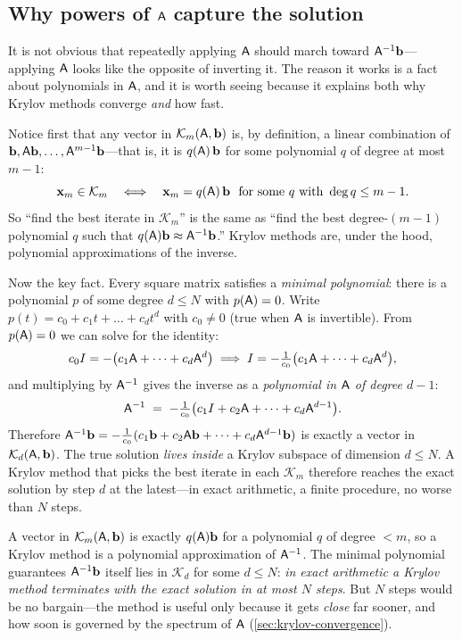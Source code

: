 \subsection{Why powers of \texorpdfstring{$\mathsf{A}$}{A} capture the solution}
\label{sec:krylov-poly}

It is not obvious that repeatedly applying $\mathsf{A}$ should march toward
$\mathsf{A}^{-1}\mathbf{b}$---applying $\mathsf{A}$ looks like the opposite of inverting it. The
reason it works is a fact about polynomials in $\mathsf{A}$, and it is worth seeing
because it explains both why Krylov methods converge \emph{and} how fast.

Notice first that any vector in $\mathcal{K}_m(\mathsf{A},\mathbf{b})$ is, by definition, a
linear combination of $\mathbf{b},\mathsf{A}\mathbf{b},\dots,\mathsf{A}^{m-1}\mathbf{b}$---that is, it is
$q(\mathsf{A})\,\mathbf{b}$ for some polynomial $q$ of degree at most $m-1$:
\[
  \mathbf{x}_m \in \mathcal{K}_m
  \quad\Longleftrightarrow\quad
  \mathbf{x}_m = q(\mathsf{A})\,\mathbf{b}
  \ \text{ for some } q \text{ with } \deg q \le m-1 .
\]
So ``find the best iterate in $\mathcal{K}_m$'' is the same as ``find the best
degree-$(m-1)$ polynomial $q$ such that $q(\mathsf{A})\mathbf{b}\approx\mathsf{A}^{-1}\mathbf{b}$.''
Krylov methods are, under the hood, polynomial approximations of the inverse.

Now the key fact. Every square matrix satisfies a \emph{minimal polynomial}: there
is a polynomial $p$ of some degree $d\le N$ with $p(\mathsf{A})=0$. Write
$p(t)=c_0+c_1t+\dots+c_d t^d$ with $c_0\neq0$ (true when $\mathsf{A}$ is invertible).
From $p(\mathsf{A})=0$ we can solve for the identity:
\[
  c_0 I = -\bigl(c_1\mathsf{A}+\dots+c_d\mathsf{A}^d\bigr)
  \;\Longrightarrow\;
  I = -\tfrac{1}{c_0}\bigl(c_1\mathsf{A}+\dots+c_d\mathsf{A}^d\bigr),
\]
and multiplying by $\mathsf{A}^{-1}$ gives the inverse as a \emph{polynomial in
$\mathsf{A}$ of degree $d-1$}:
\[
  \mathsf{A}^{-1} \;=\; -\tfrac{1}{c_0}\bigl(c_1 I + c_2\mathsf{A} + \dots + c_d\mathsf{A}^{d-1}\bigr).
\]
Therefore $\mathsf{A}^{-1}\mathbf{b}=-\tfrac{1}{c_0}(c_1\mathbf{b}+c_2\mathsf{A}\mathbf{b}+\dots+c_d\mathsf{A}^{d-1}\mathbf{b})$
is exactly a vector in $\mathcal{K}_d(\mathsf{A},\mathbf{b})$. The true solution \emph{lives
inside} a Krylov subspace of dimension $d\le N$. A Krylov method that picks the
best iterate in each $\mathcal{K}_m$ therefore reaches the exact solution by step
$d$ at the latest---in exact arithmetic, a finite procedure, no worse than $N$
steps.

\begin{keyidea}
A vector in $\mathcal{K}_m(\mathsf{A},\mathbf{b})$ is exactly $q(\mathsf{A})\mathbf{b}$ for a polynomial
$q$ of degree $<m$, so a Krylov method is a polynomial approximation of
$\mathsf{A}^{-1}$. The minimal polynomial guarantees $\mathsf{A}^{-1}\mathbf{b}$ itself lies in
$\mathcal{K}_d$ for some $d\le N$: \emph{in exact arithmetic a Krylov method
terminates with the exact solution in at most $N$ steps}. But $N$ steps would be no
bargain---the method is useful only because it gets \emph{close} far sooner, and how
soon is governed by the spectrum of $\mathsf{A}$ (\cref{sec:krylov-convergence}).
\end{keyidea}

